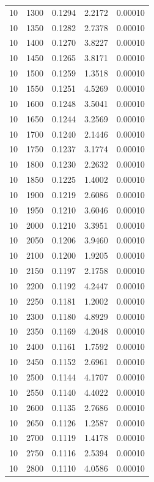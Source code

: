 \begin{longtable}{ccccc}
    10 & 1300 & 0.1294 & 2.2172 & 0.00010 \\
    10 & 1350 & 0.1282 & 2.7378 & 0.00010 \\
    10 & 1400 & 0.1270 & 3.8227 & 0.00010 \\
    10 & 1450 & 0.1265 & 3.8171 & 0.00010 \\
    10 & 1500 & 0.1259 & 1.3518 & 0.00010 \\
    10 & 1550 & 0.1251 & 4.5269 & 0.00010 \\
    10 & 1600 & 0.1248 & 3.5041 & 0.00010 \\
    10 & 1650 & 0.1244 & 3.2569 & 0.00010 \\
    10 & 1700 & 0.1240 & 2.1446 & 0.00010 \\
    10 & 1750 & 0.1237 & 3.1774 & 0.00010 \\
    10 & 1800 & 0.1230 & 2.2632 & 0.00010 \\
    10 & 1850 & 0.1225 & 1.4002 & 0.00010 \\
    10 & 1900 & 0.1219 & 2.6086 & 0.00010 \\
    10 & 1950 & 0.1210 & 3.6046 & 0.00010 \\
    10 & 2000 & 0.1210 & 3.3951 & 0.00010 \\
    10 & 2050 & 0.1206 & 3.9460 & 0.00010 \\
    10 & 2100 & 0.1200 & 1.9205 & 0.00010 \\
    10 & 2150 & 0.1197 & 2.1758 & 0.00010 \\
    10 & 2200 & 0.1192 & 4.2447 & 0.00010 \\
    10 & 2250 & 0.1181 & 1.2002 & 0.00010 \\
    10 & 2300 & 0.1180 & 4.8929 & 0.00010 \\
    10 & 2350 & 0.1169 & 4.2048 & 0.00010 \\
    10 & 2400 & 0.1161 & 1.7592 & 0.00010 \\
    10 & 2450 & 0.1152 & 2.6961 & 0.00010 \\
    10 & 2500 & 0.1144 & 4.1707 & 0.00010 \\
    10 & 2550 & 0.1140 & 4.4022 & 0.00010 \\
    10 & 2600 & 0.1135 & 2.7686 & 0.00010 \\
    10 & 2650 & 0.1126 & 1.2587 & 0.00010 \\
    10 & 2700 & 0.1119 & 1.4178 & 0.00010 \\
    10 & 2750 & 0.1116 & 2.5394 & 0.00010 \\
    10 & 2800 & 0.1110 & 4.0586 & 0.00010 \\

\end{longtable}
